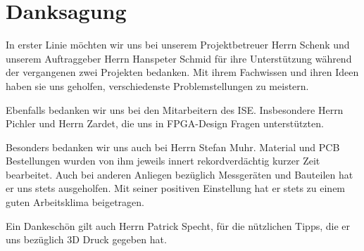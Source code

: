\clearpage
\section{Danksagung}\label{sec:Danksagung}

In erster Linie möchten wir uns bei unserem Projektbetreuer Herrn Schenk und unserem Auftraggeber Herrn Hanspeter Schmid für ihre Unterstützung während der vergangenen zwei Projekten bedanken. Mit ihrem Fachwissen und ihren Ideen haben sie uns geholfen, verschiedenste Problemstellungen zu meistern. 

Ebenfalls bedanken wir uns bei den Mitarbeitern des ISE. Insbesondere Herrn Pichler und Herrn Zardet, die uns in FPGA-Design Fragen unterstützten.

Besonders bedanken wir uns auch bei Herrn Stefan Muhr. Material und PCB Bestellungen wurden von ihm jeweils innert rekordverdächtig kurzer Zeit bearbeitet. Auch bei anderen Anliegen bezüglich Messgeräten und Bauteilen hat er uns stets ausgeholfen. Mit seiner positiven Einstellung hat er stets zu einem guten Arbeitsklima beigetragen.  

Ein Dankeschön gilt auch Herrn Patrick Specht, für die nützlichen Tipps, die er uns bezüglich 3D Druck gegeben hat.




